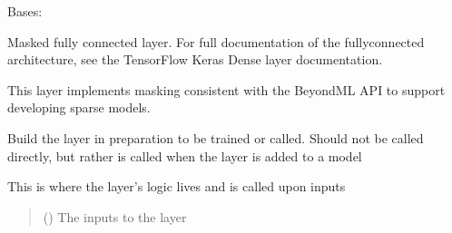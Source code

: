 \documentclass[letterpaper,10pt,english]{sphinxmanual}
\begin{document}
\begin{fulllineitems}
\label{\detokenize{beyondml.tflow.layers:beyondml.tflow.layers.MaskedDense.MaskedDense}}
\pysigstartsignatures
{}
\pysigstopsignatures
\sphinxAtStartPar
Bases: 

\sphinxAtStartPar
Masked fully connected layer. For full documentation of the fully\sphinxhyphen{}connected architecture, see the
TensorFlow Keras Dense layer documentation.

\sphinxAtStartPar
This layer implements masking consistent with the BeyondML API to support developing sparse models.

\begin{fulllineitems}
\label{\detokenize{beyondml.tflow.layers:beyondml.tflow.layers.MaskedDense.MaskedDense.build}}
\pysigstartsignatures
{}
\pysigstopsignatures
\sphinxAtStartPar
Build the layer in preparation to be trained or called. Should not be called directly,
but rather is called when the layer is added to a model

\end{fulllineitems}


\begin{fulllineitems}
\label{\detokenize{beyondml.tflow.layers:beyondml.tflow.layers.MaskedDense.MaskedDense.call}}
\pysigstartsignatures
{}
\pysigstopsignatures
\sphinxAtStartPar
This is where the layer’s logic lives and is called upon inputs
\begin{quote}\begin{description}
\sphinxAtStartPar
{} () \textendash{} The inputs to the layer


\end{description}
\end{quote}
\end{fulllineitems}
\end{fulllineitems}
\end{document}
